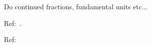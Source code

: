 \documentclass[0-main]{subfiles}
\begin{document}

Do continued fractions, fundamental units etc...




Ref:~\cite{Williams1970}.





Ref:~\cite{MW2019}
\end{document}
